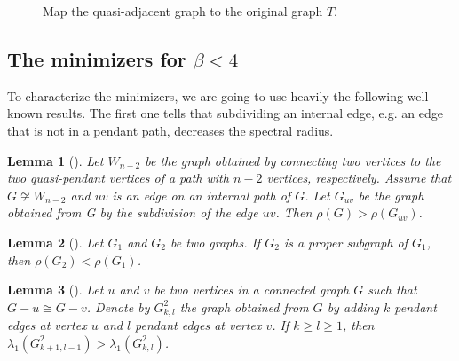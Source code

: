 \documentclass[12pt]{amsart}
\newtheorem{lem}{Lemma}[section]
\newcommand{\cvt}[1]{\textcolor{red}{#1}}
\begin{document}
\begin{figure}[h]
\caption{Map the quasi-adjacent graph to the original graph $T$.}\label{fig-main-tree-beta}
\end{figure}


\subsection{The minimizers for $\beta <4$}

To characterize the minimizers, we are going to use heavily the following well known results.
The first one tells that subdividing an internal edge, e.g. an edge that is not in a pendant path, decreases the spectral radius. 
\begin{lem}[\cite{HoffmanSmith1975}]\label{subdivision}
		Let $ W_{n-2} $ be the graph obtained by connecting two vertices to the two quasi-pendant vertices of a path with $n - 2$ vertices, respectively. Assume that 
		$G \not\cong W_{n-2}$ and $uv$ is an edge on an internal path of $G$. Let $G_{uv}$ be the graph obtained from G by the subdivision of the edge $uv$. Then $\rho(G)>\rho(G_{uv})$.
\end{lem}

\begin{lem}[\cite{LiFeng1979}]\label{propersubgraph}
	Let $G_1$ and $G_2$ be two graphs. If $G_2$ is a proper subgraph of $G_1$, then $\rho(G_2)<\rho(G_1)$.
\end{lem}

\begin{lem}[\cite{LinGuo2006}]\label{average-min}
	Let $u$ and $v$ be two vertices in a connected graph $G$ such that $G - u \cong G - v$. 
	Denote by $G_{k,l}^2$ the graph obtained from $G$ by adding $k$ pendant edges at vertex $u$ and $l$ pendant edges at vertex $v$. 
	If $k \ge l \ge 1$, then 
	$\lambda_1\!\left(G_{k+1,l-1}^2\right) > \lambda_1\!\left(G_{k,l}^2\right)$.
\end{lem}
\end{document}
